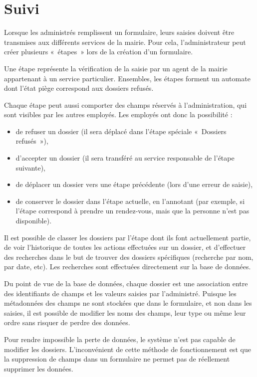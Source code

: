 \section{Suivi}\label{sec:suivi}

Lorsque les administrés remplissent un formulaire, leurs saisies doivent être transmises aux différents services de la mairie.
Pour cela, l'administrateur peut créer plusieurs «~étapes~» lors de la création d'un formulaire.

Une étape représente la vérification de la saisie par un agent de la mairie appartenant à un service particulier.
Ensembles, les étapes forment un automate dont l'état piège correspond aux dossiers refusés.

Chaque étape peut aussi comporter des champs réservés à l'administration, qui sont visibles par les autres employés.
Les employés ont donc la possibilité :
\begin{itemize}
	\item de refuser un dossier (il sera déplacé dans l'étape spéciale «~Dossiers refusés~»),
	\item d'accepter un dossier (il sera transféré au service responsable de l'étape suivante),
	\item de déplacer un dossier vers une étape précédente (lors d'une erreur de saisie),
	\item de conserver le dossier dans l'étape actuelle, en l'annotant (par exemple, si l'étape correspond à prendre un rendez-vous, mais que la personne n'est pas disponible).
\end{itemize}

\uparagraph
Il est possible de classer les dossiers par l'étape dont ils font actuellement partie, de voir l'historique de toutes les actions effectuées sur un dossier, et d'effectuer des recherches dans le but de trouver des dossiers spécifiques (recherche par nom, par date, etc).
Les recherches sont effectuées directement sur la base de données.

\uparagraph
Du point de vue de la base de données, chaque dossier est une association entre des identifiants de champs et les valeurs saisies par l'administré.
Puisque les métadonnées des champs ne sont stockées que dans le formulaire, et non dans les saisies, il est possible de modifier les noms des champs, leur type ou même leur ordre sans risquer de perdre des données.

Pour rendre impossible la perte de données, le système n'est pas capable de modifier les dossiers.
L'inconvénient de cette méthode de fonctionnement est que la suppression de champs dans un formulaire ne permet pas de réellement supprimer les données.
